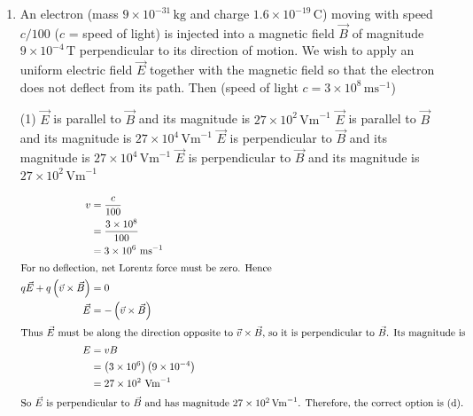 \begin{enumerate}[leftmargin=*]
\item An electron (mass $9 \times 10^{-31}\,\mathrm{kg}$ and charge $1.6 \times 10^{-19}\,\mathrm{C}$) moving with speed $c/100$ ($c$ = speed of light) is injected into a magnetic field $\vec{B}$ of magnitude $9 \times 10^{-4}\,\mathrm{T}$ perpendicular to its direction of motion. We wish to apply an uniform electric field $\vec{E}$ together with the magnetic field so that the electron does not deflect from its path. Then (speed of light $c = 3 \times 10^8\,\mathrm{m s}^{-1}$)
\begin{tasks}(1)
    \task $\vec{E}$ is parallel to $\vec{B}$ and its magnitude is $27 \times 10^2\,\mathrm{V m}^{-1}$
    \task $\vec{E}$ is parallel to $\vec{B}$ and its magnitude is $27 \times 10^4\,\mathrm{V m}^{-1}$
    \task $\vec{E}$ is perpendicular to $\vec{B}$ and its magnitude is $27 \times 10^4\,\mathrm{V m}^{-1}$
    \task $\vec{E}$ is perpendicular to $\vec{B}$ and its magnitude is $27 \times 10^2\,\mathrm{V m}^{-1}$ \ans
\end{tasks}
\begin{solution}
\begin{align*}
v &= \frac{c}{100} \\
  &= \frac{3 \times 10^8}{100} \\
  &= 3 \times 10^6 \ \mathrm{m s}^{-1} \\
\intertext{For no deflection, net Lorentz force must be zero. Hence}
q\vec{E} + q\left( \vec{v} \times \vec{B} \right) &= 0 \\
\vec{E} &= -\left( \vec{v} \times \vec{B} \right) \\
\intertext{Thus $\vec{E}$ must be along the direction opposite to $\vec{v} \times \vec{B}$, so it is perpendicular to $\vec{B}$. Its magnitude is}
E &= v B \\
  &= \left( 3 \times 10^6 \right)\left( 9 \times 10^{-4} \right) \\
  &= 27 \times 10^2 \ \mathrm{V m}^{-1} \\
\intertext{So $\vec{E}$ is perpendicular to $\vec{B}$ and has magnitude $27 \times 10^2\,\mathrm{V m}^{-1}$. Therefore, the correct option is (d).}
\end{align*}
\end{solution}


\end{enumerate}

